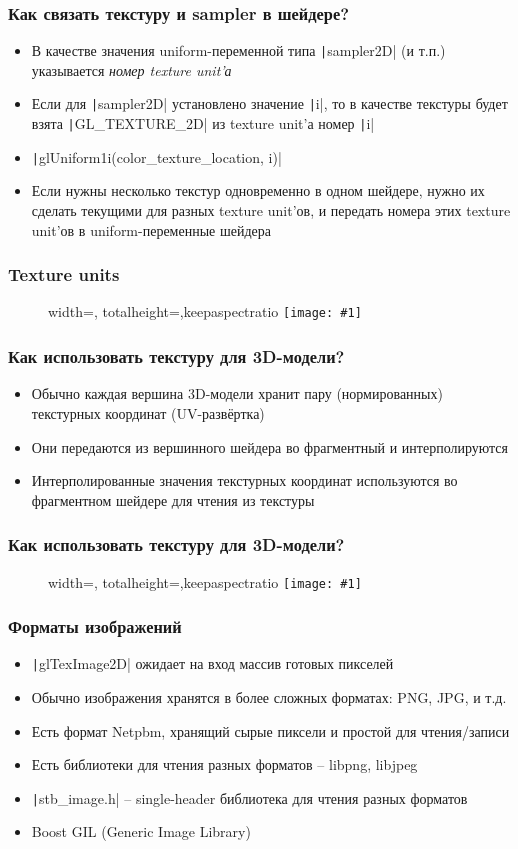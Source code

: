 \documentclass[10pt]{beamer}
\newcommand{\slideimage}[1]{
  \begin{figure}
    \begin{adjustbox}{width=\textwidth, totalheight=\textheight-2\baselineskip-2\baselineskip,keepaspectratio}
      \texttt{[image: \#1]}
    \end{adjustbox}
  \end{figure}
}
\begin{document}
\begin{frame}[fragile]
\frametitle{Как связать текстуру и sampler в шейдере?}
\begin{itemize}
\item В качестве значения uniform-переменной типа \texttt|sampler2D| (и т.п.) указывается \textit{номер texture unit'а}
\pause
\item Если для \texttt|sampler2D| установлено значение \texttt|i|, то в качестве текстуры будет взята \texttt|GL_TEXTURE_2D| из texture unit'а номер \texttt|i|
\pause
\item \texttt|glUniform1i(color_texture_location, i)|
\pause
\item Если нужны несколько текстур одновременно в одном шейдере, нужно их сделать текущими для разных texture unit'ов, и передать номера этих texture unit'ов в uniform-переменные шейдера
\end{itemize}
\end{frame}

\begin{frame}[fragile]
\frametitle{Texture units}
\slideimage{texture_units.png}
\end{frame}

\begin{frame}[fragile]
\frametitle{Как использовать текстуру для 3D-модели?}
\begin{itemize}
\item Обычно каждая вершина 3D-модели хранит пару (нормированных) текстурных координат (UV-развёртка)
\pause
\item Они передаются из вершинного шейдера во фрагментный и интерполируются
\pause
\item Интерполированные значения текстурных координат используются во фрагментном шейдере для чтения из текстуры
\end{itemize}
\end{frame}

\begin{frame}[fragile]
\frametitle{Как использовать текстуру для 3D-модели?}
\slideimage{uvs.png}
\end{frame}

\begin{frame}[fragile]
\frametitle{Форматы изображений}
\begin{itemize}
\item \texttt|glTexImage2D| ожидает на вход массив готовых пикселей
\pause
\item Обычно изображения хранятся в более сложных форматах: PNG, JPG, и т.д.
\pause
\item Есть формат Netpbm, хранящий сырые пиксели и простой для чтения/записи
\pause
\item Есть библиотеки для чтения разных форматов -- libpng, libjpeg
\pause
\item \texttt|stb_image.h| -- single-header библиотека для чтения разных форматов
\pause
\item Boost GIL (Generic Image Library)
\end{itemize}
\end{frame}
\end{document}
